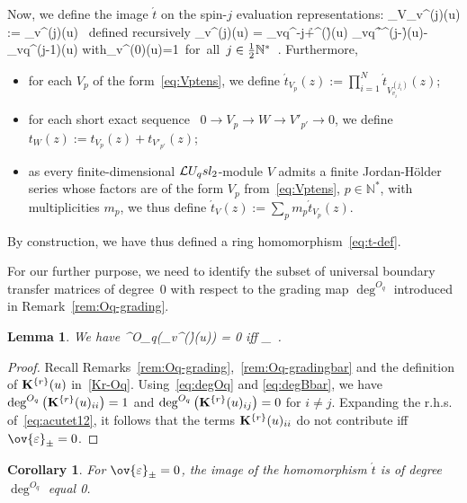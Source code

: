 \documentclass[11pt]{amsart}
\numberwithin{equation}{section}
\newtheorem{cor}[thm]{Corollary}
\newtheorem{lem}[thm]{Lemma}
\numberwithin{equation}{section}
\begin{document}
Now, we define the image $\acute{t}$ on the spin-$j$ evaluation representations:
\beqa
{}_{V_{v}^{(j)}}(u) := _v^{(j)}(u)\ \label{eq:tcutej}
\eeqa
defined recursively
\beqa
\label{TTacute-j}
		  	_{v}^{(j)}(u) =   _{vq^{-j+\h}}^{(\h)}(u) _{vq^\h}^{(j-\h)}(u)- _{vq}^{(j-1)}(u) \quad \mbox{with}\quad {}_{v}^{(0)}(u)=1\quad \mbox{ for all $j \in  \h{\mathbb N}^*$}\ .
\eeqa
Furthermore, 
\begin{itemize}
\item
for each $V_p$ of the form~\eqref{eq:Vptens}, 
we define $\acute{t}_{V_p}(z):= \prod_{i=1}^N\acute{t}_{V_{v_i}^{(j_i)}}(z)$;  

\item for each short exact sequence \ $0 \rightarrow V_p \rightarrow W \rightarrow V'_{p'} \rightarrow 0$, we define $t_{W}(z) := t_{V_p}(z)+t_{V'_{p'}}(z)$;

\item as every finite-dimensional $\mathcal{L} U_q sl_2$-module $V$ 
admits a finite Jordan-Hölder series whose factors are of the form $V_p$ from~\eqref{eq:Vptens}, $p\in{\mathbb N}^*$, with multiplicities $m_p$, we thus define
$\acute{t}_V(z) := \sum_p m_p \acute{t}_{V_p}(z)$.
\end{itemize}
By construction, we have thus defined  a ring homomorphism~\eqref{eq:t-def}.

For our further purpose, we need to identify the subset of universal boundary transfer matrices of degree~$0$ with respect to the  grading map $\deg^{O_q}$ introduced in Remark~\ref{rem:Oq-grading}. 
\begin{lem}\label{lem:degtcute}
We have
\beqa
\deg^{O_q}(_v^{(\h)}(u)) = 0 \quad\mbox{iff} \quad \ov{\varepsilon}_\ .
\eeqa
\end{lem}
\begin{proof} Recall Remarks~\ref{rem:Oq-grading},~\ref{rem:Oq-gradingbar} and the definition of ${\bold K}^{\{r\}}(u)$ in~\eqref{Kr-Oq}. Using~\eqref{eq:degOq} and \eqref{eq:degBbar}, we have $\deg^{O_q}\big({\bold K}^{\{r\}}(u)_{ii}\big)=1$ and $\deg^{O_q}\big({\bold K}^{\{r\}}(u)_{ij}\big)=0$ for $i\neq j$. Expanding the r.h.s.\,of~\eqref{eq:acutet12}, it follows that the terms ${\bold K}^{\{r\}}(u)_{ii}$ do not contribute iff $\ov{\varepsilon}_\pm=0$.
\end{proof}

\begin{cor}\label{cor:degtcute}
    For $\ov{\varepsilon}_\pm=0$, the image of the homomorphism $\acute{t}$ is of degree $\deg^{O_q}$ equal 0.
\end{cor}
\end{document}
